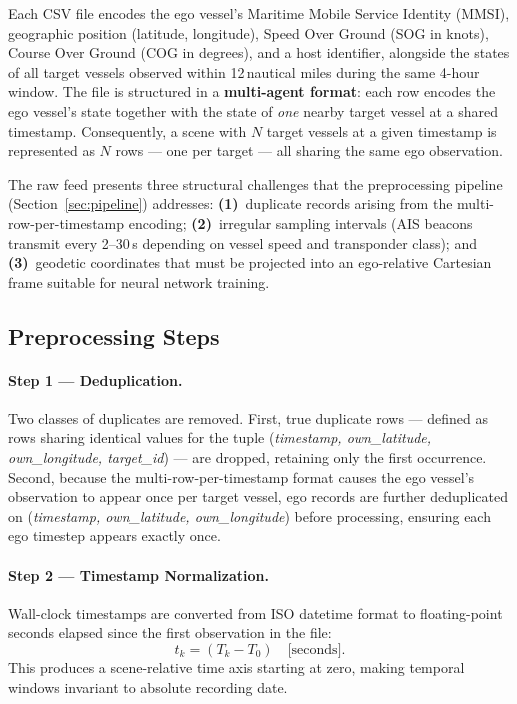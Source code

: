 \documentclass[12pt, a4paper]{article}
\begin{document}
  Each CSV file encodes the ego vessel's Maritime Mobile Service Identity (MMSI), geographic
  position (latitude, longitude), Speed Over Ground (SOG in knots), Course Over Ground
  (COG in degrees), and a host identifier, alongside the states of all target vessels observed
  within 12\,nautical miles during the same 4-hour window.
  The file is structured in a \textbf{multi-agent format}: each row encodes the ego vessel's
  state together with the state of \emph{one} nearby target vessel at a shared timestamp.
  Consequently, a scene with $N$ target vessels at a given timestamp is represented as $N$ rows
  --- one per target --- all sharing the same ego observation.

  The raw feed presents three structural challenges that the preprocessing pipeline
  (Section~\ref{sec:pipeline}) addresses:
  \textbf{(1)}~duplicate records arising from the multi-row-per-timestamp encoding;
  \textbf{(2)}~irregular sampling intervals (AIS beacons transmit every 2--30\,s depending
  on vessel speed and transponder class); and
  \textbf{(3)}~geodetic coordinates that must be projected into an ego-relative Cartesian
  frame suitable for neural network training.

  \subsection{Preprocessing Steps}

  \paragraph{Step 1 --- Deduplication.}
  Two classes of duplicates are removed. First, true duplicate rows --- defined as rows sharing identical values for the tuple (\textit{timestamp, own\_latitude, own\_longitude, target\_id}) --- are dropped,
  retaining only the first occurrence. Second, because the multi-row-per-timestamp format causes the ego vessel's observation to appear once per target vessel, ego records are further deduplicated on
  (\textit{timestamp, own\_latitude, own\_longitude}) before processing, ensuring each ego timestep appears exactly once.

  \paragraph{Step 2 --- Timestamp Normalization.}
  Wall-clock timestamps are converted from ISO datetime format to floating-point seconds elapsed since the first observation in the file:
  \[
      t_k = (T_k - T_0) \quad \text{[seconds]}.
  \]
  This produces a scene-relative time axis starting at zero, making temporal windows invariant to absolute recording date.
\end{document}

